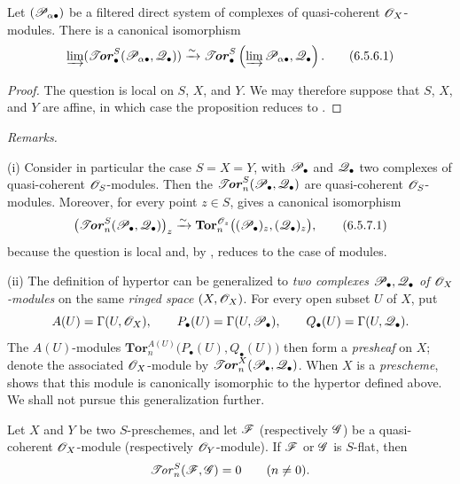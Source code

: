 \begin{proposition}[6.5.6]
\label{III.6.5.6}
Let $(\mathscr{P}_{\alpha\bullet})$ be a filtered direct system of
complexes of quasi-coherent $\mathscr{O}_X$-modules.  There is a
canonical isomorphism
\[
  \varinjlim
  (\boldsymbol{\mathscr{T}\!\mathit{or}}_\bullet^S(\mathscr{P}_{\alpha\bullet},\mathscr{Q}_\bullet))
  \xrightarrow{\sim}
  \boldsymbol{\mathscr{T}\!\mathit{or}}_\bullet^S
  \left(\varinjlim\mathscr{P}_{\alpha\bullet},\mathscr{Q}_\bullet\right).
  \tag{6.5.6.1}\label{III.6.5.6.1}
\]
\end{proposition}

\begin{proof}
The question is local on $S$, $X$, and $Y$.  We may therefore
suppose that $S$, $X$, and $Y$ are affine, in which case the
proposition reduces to .
\end{proof}

\begin{env}[6.5.7]
\label{III.6.5.7}
\emph{Remarks.}

\textnormal{(i)} Consider in particular the case $S=X=Y$, with
$\mathscr{P}_\bullet$ and $\mathscr{Q}_\bullet$ two complexes of
quasi-coherent $\mathscr{O}_S$-modules.  Then the
$\boldsymbol{\mathscr{T}\!\mathit{or}}_n^S(\mathscr{P}_\bullet,\mathscr{Q}_\bullet)$ are quasi-coherent
$\mathscr{O}_S$-modules.  Moreover, for every point $z\in S$,
 gives a canonical isomorphism
\[
  \bigl(\boldsymbol{\mathscr{T}\!\mathit{or}}_n^S(\mathscr{P}_\bullet,\mathscr{Q}_\bullet)\bigr)_z
  \xrightarrow{\sim}
  \mathbf{Tor}_n^{\mathscr{O}_z}
  \bigl((\mathscr{P}_\bullet)_z,(\mathscr{Q}_\bullet)_z\bigr),
  \tag{6.5.7.1}\label{III.6.5.7.1}
\]
because the question is local and, by ,
reduces to the case of modules.

\textnormal{(ii)} The definition of hypertor can be generalized
to \emph{two complexes $\mathscr{P}_\bullet,\mathscr{Q}_\bullet$ of
$\mathscr{O}_X$-modules} on the same \emph{ringed space} $(X,\mathscr{O}_X)$.  For
every open subset $U$ of $X$, put
\[
  A(U)=\Gamma(U,\mathscr{O}_X),\qquad
  P_\bullet(U)=\Gamma(U,\mathscr{P}_\bullet),\qquad
  Q_\bullet(U)=\Gamma(U,\mathscr{Q}_\bullet).
\]
The $A(U)$-modules $\mathbf{Tor}_n^{A(U)}\bigl(P_\bullet(U),Q_\bullet(U)\bigr)$
then form a \emph{presheaf} on $X$; denote the associated
$\mathscr{O}_X$-module by
$\boldsymbol{\mathscr{T}\!\mathit{or}}_n^X(\mathscr{P}_\bullet,\mathscr{Q}_\bullet)$.  When $X$ is a
\emph{prescheme},  shows that this module is
canonically isomorphic to the hypertor defined above.  We shall
not pursue this generalization further.
\end{env}

\begin{proposition}[6.5.8]
\label{III.6.5.8}
Let $X$ and $Y$ be two $S$-preschemes, and let $\mathscr{F}$
\textup{(respectively $\mathscr{G}$)} be a quasi-coherent $\mathscr{O}_X$-module
\textup{(respectively} $\mathscr{O}_Y$-module\textup{)}.  If $\mathscr{F}$ or $\mathscr{G}$ is
$S$-flat, then
\[
  \mathscr{T}\!\mathit{or}_n^S(\mathscr{F},\mathscr{G})=0\qquad(n\ne0).
\]
\end{proposition}

